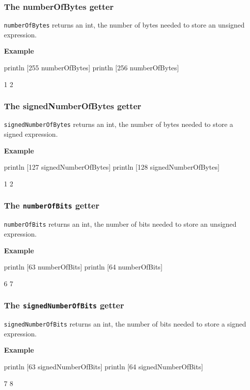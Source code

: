 \documentclass[10pt,openright,twosides]{report}
\newcommand{\gtlinline}[1]{\colorbox{light-blue}{\lstinline[language=gtl]{#1}}}
\newcommand{\example}{\vspace{.75em}\noindent\textbf{Example}\vspace{0em}}
\begin{document}
\subsubsection{The {\bfseries\ttfamily numberOfBytes} getter}

\gtlinline{numberOfBytes} returns an int, the number of bytes needed to store an unsigned expression.

\example
\begin{gtl}
println [255 numberOfBytes]
println [256 numberOfBytes]
\end{gtl}
\begin{console}
1
2
\end{console}

\subsubsection{The {\bfseries\ttfamily signedNumberOfBytes} getter}

\gtlinline{signedNumberOfBytes} returns an int, the number of bytes needed to store a signed expression. 

\example
\begin{gtl}
println [127 signedNumberOfBytes]
println [128 signedNumberOfBytes]
\end{gtl}
\begin{console}
1
2
\end{console}

\subsubsection{The \texttt{numberOfBits} getter}

\gtlinline{numberOfBits} returns an int, the number of bits needed to store an unsigned expression.

\example
\begin{gtl}
println [63 numberOfBits]
println [64 numberOfBits]
\end{gtl}
\begin{console}
6
7
\end{console}


\subsubsection{The \texttt{signedNumberOfBits} getter}

\gtlinline{signedNumberOfBits} returns an int, the number of bits needed to store a signed expression. 

\example
\begin{gtl}
println [63 signedNumberOfBits]
println [64 signedNumberOfBits]
\end{gtl}
\begin{console}
7
8
\end{console}
\end{document}
